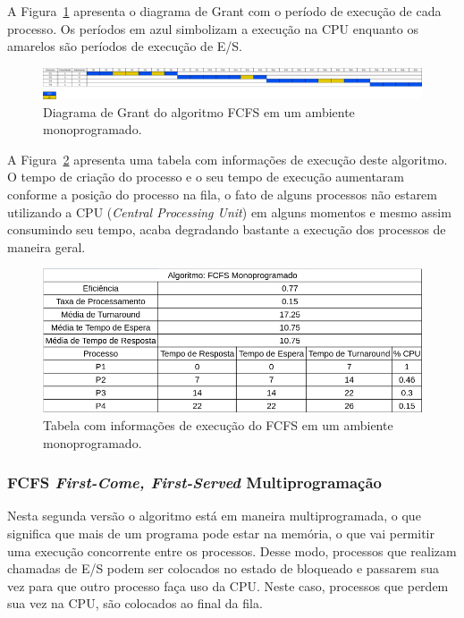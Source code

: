 \documentclass[
	12pt,				%
	oneside,   	        %
	a4paper,			%
	english,			%
	french,				%
	spanish,			%
	brazil,				%
	]{pacotes/abntex2}
\begin{document}
A Figura~\ref{fig:fcfs-mono} apresenta o diagrama de Grant com o período de execução de cada processo. Os períodos em azul simbolizam a execução na CPU enquanto os amarelos são períodos de execução de E/S.

\begin{figure}[H]
  \centering
  \includegraphics[scale=0.20]{figuras/ex1/fifo-mono.png}
  \caption{Diagrama de Grant do algoritmo FCFS em um ambiente monoprogramado.}
  \label{fig:fcfs-mono}
\end{figure}

A Figura~\ref{fig:table-fcfs-mono} apresenta uma tabela com informações de execução deste algoritmo. O tempo de criação do processo e o seu tempo de execução aumentaram conforme a posição do processo na fila, o fato de alguns processos não estarem utilizando a CPU (\textit{Central Processing Unit}) em  alguns momentos e mesmo assim consumindo seu tempo, acaba degradando bastante a execução dos processos de maneira geral.

\begin{figure}[H]
  \centering
  \includegraphics[scale=0.5]{figuras/ex1/table-fifo-mono.png}
  \caption{Tabela com informações de execução do FCFS em um ambiente monoprogramado.}
  \label{fig:table-fcfs-mono}
\end{figure}

\subsubsection{FCFS \textit{First-Come, First-Served} Multiprogramação}
\label{subsubsec:multi_fcfs}

Nesta segunda versão o algoritmo está em maneira multiprogramada, o que significa que mais de um programa pode estar na memória, o que vai permitir uma execução concorrente entre os processos. Desse modo, processos que realizam chamadas de E/S podem ser colocados no estado de bloqueado e passarem sua vez para que outro processo faça uso da CPU. Neste caso, processos que perdem sua vez na CPU, são colocados ao final da fila. 
\end{document}
